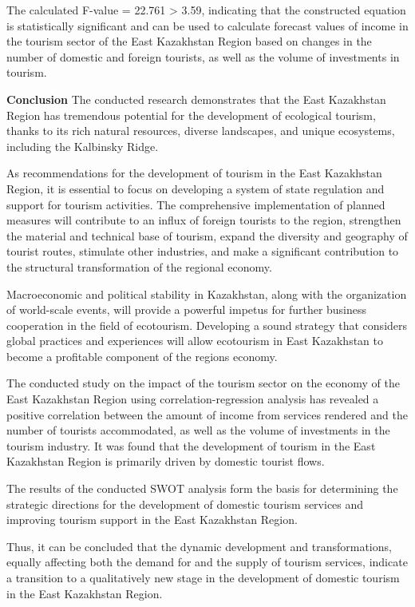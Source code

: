 The calculated F-value = 22.761 \textgreater{} 3.59, indicating that the
constructed equation is statistically significant and can be used to
calculate forecast values of income in the tourism sector of the East
Kazakhstan Region based on changes in the number of domestic and foreign
tourists, as well as the volume of investments in tourism.

{\bfseries Conclusion} The conducted research demonstrates that the East
Kazakhstan Region has tremendous potential for the development of
ecological tourism, thanks to its rich natural resources, diverse
landscapes, and unique ecosystems, including the Kalbinsky Ridge.

As recommendations for the development of tourism in the East Kazakhstan
Region, it is essential to focus on developing a system of state
regulation and support for tourism activities. The comprehensive
implementation of planned measures will contribute to an influx of
foreign tourists to the region, strengthen the material and technical
base of tourism, expand the diversity and geography of tourist routes,
stimulate other industries, and make a significant contribution to the
structural transformation of the regional economy.

Macroeconomic and political stability in Kazakhstan, along with the
organization of world-scale events, will provide a powerful impetus for
further business cooperation in the field of ecotourism. Developing a
sound strategy that considers global practices and experiences will
allow ecotourism in East Kazakhstan to become a profitable component of
the region\textquotesingle s economy.

The conducted study on the impact of the tourism sector on the economy
of the East Kazakhstan Region using correlation-regression analysis has
revealed a positive correlation between the amount of income from
services rendered and the number of tourists accommodated, as well as
the volume of investments in the tourism industry. It was found that the
development of tourism in the East Kazakhstan Region is primarily driven
by domestic tourist flows.

The results of the conducted SWOT analysis form the basis for
determining the strategic directions for the development of domestic
tourism services and improving tourism support in the East Kazakhstan
Region.

Thus, it can be concluded that the dynamic development and
transformations, equally affecting both the demand for and the supply of
tourism services, indicate a transition to a qualitatively new stage in
the development of domestic tourism in the East Kazakhstan Region.

